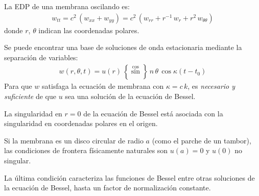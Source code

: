 La EDP de una membrana oscilando es:
\begin{align*}
w_{tt} = c^{2} \, (w_{xx} + w_{yy}) = c^{2} \, (w_{rr} + r^{-1} \, w_{r} + r^{2} \, w_{\theta \theta})
\end{align*}
donde $r$, $\theta$ indican las coordenadas polares.
\par
Se puede encontrar una base de soluciones de onda estacionaria mediante la separación de variables:
\begin{align*}
w (r, \theta, t) = u (r) \, \left\{ \stackrel{\displaystyle \cos}{\sin} \right\} \, n \, \theta \, \cos \kappa (t - t_{0})
\end{align*}
Para que $w$ satisfaga la ecuación de membrana con $\kappa = c \, k$,  es \emph{necesario y suficiente} de que $u$ sea una solución de la ecuación de Bessel.
\par
La singularidad en $r = 0$ de la ecuación de Bessel está asociada con la singularidad en coordenadas polares en el origen.
\par
Si la membrana es un disco circular de radio $a$ (como el parche de un tambor),  las condiciones de frontera físicamente naturales son $u (a) = 0$ y $u(0)$ no singular.
\par
La última condición caracteriza las funciones de Bessel entre otras soluciones de la ecuación de Bessel, hasta un factor de normalización constante.
